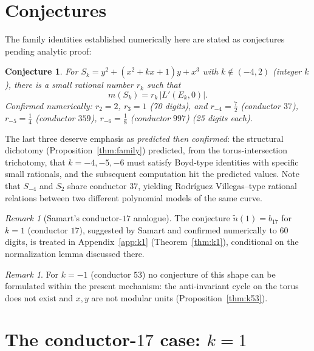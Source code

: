 \documentclass[preprint,12pt]{elsarticle}
\newtheorem{conjecture}[theorem]{Conjecture}
\theoremstyle{definition}
\theoremstyle{remark}
\newtheorem{remark}[theorem]{Remark}
\begin{document}
\section{Conjectures}
\label{sec:conjectures}

The family identities established numerically here are stated as conjectures
pending analytic proof:

\begin{conjecture}\label{conj:family}
For $S_k=y^2+(x^2+kx+1)y+x^3$ with $k\notin(-4,2)$ (integer $k$), there is a
small rational number $r_k$ such that
\[
  m(S_k)=r_k\,|L'(E_k,0)|.
\]
Confirmed numerically: $r_2=2$, $r_3=1$ (70 digits), and
$r_{-4}=\tfrac72$ (conductor $37$), $r_{-5}=\tfrac14$ (conductor $359$),
$r_{-6}=\tfrac18$ (conductor $997$) (25 digits each).
\end{conjecture}

The last three deserve emphasis as \emph{predicted then confirmed}: the
structural dichotomy (Proposition~\ref{thm:family}) predicted, from the
torus-intersection trichotomy, that $k=-4,-5,-6$ must satisfy Boyd-type
identities with specific small rationals, and the subsequent computation hit
the predicted values. Note that $S_{-4}$ and $S_2$ share conductor $37$,
yielding Rodr\'iguez Villegas--type rational relations \cite{RV,LalinRam}
between two different polynomial models of the same curve.

\begin{remark}[Samart's conductor-$17$ analogue]
The conjecture $\tilde n(1)=b_{17}$ for $k=1$ (conductor $17$), suggested by
Samart and confirmed numerically to $60$ digits, is treated in
Appendix~\ref{app:k1} (Theorem~\ref{thm:k1}), conditional on the
normalization lemma discussed there.
\end{remark}

\begin{remark}
For $k=-1$ (conductor $53$) no conjecture of this shape can be formulated
within the present mechanism: the anti-invariant cycle on the torus does not
exist and $x,y$ are not modular units (Proposition~\ref{thm:k53}).
\end{remark}

\appendix
\section{The conductor-\texorpdfstring{$17$}{17} case: \texorpdfstring{$k=1$}{k=1}}
\label{sec:k1}
\label{app:k1}
\end{document}
